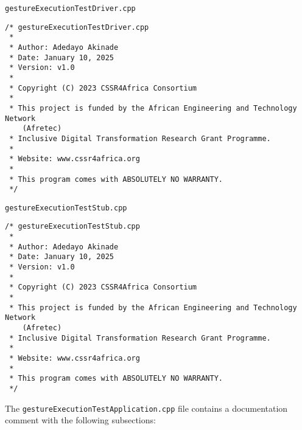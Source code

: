 \documentclass{CSSRforAfrica}
\newcommand{\blank}{~\\}
\newcommand{\checkboxChecked}{\fbox{\ding{51}}} %
\begin{document}
\begin{description}
\newpage
\item[\checkboxChecked] {\small \verb+gestureExecutionTestDriver.cpp+}  
{\small \begin{verbatim}
/* gestureExecutionTestDriver.cpp
 *
 * Author: Adedayo Akinade
 * Date: January 10, 2025
 * Version: v1.0
 * 
 * Copyright (C) 2023 CSSR4Africa Consortium
 * 
 * This project is funded by the African Engineering and Technology Network
    (Afretec) 
 * Inclusive Digital Transformation Research Grant Programme. 
 *
 * Website: www.cssr4africa.org
 *
 * This program comes with ABSOLUTELY NO WARRANTY.
 */
\end{verbatim} }

\item[\checkboxChecked]  {\small \verb+gestureExecutionTestStub.cpp+}  
{\small \begin{verbatim}
/* gestureExecutionTestStub.cpp
 *
 * Author: Adedayo Akinade
 * Date: January 10, 2025
 * Version: v1.0
 * 
 * Copyright (C) 2023 CSSR4Africa Consortium
 * 
 * This project is funded by the African Engineering and Technology Network
    (Afretec) 
 * Inclusive Digital Transformation Research Grant Programme. 
 *
 * Website: www.cssr4africa.org
 *
 * This program comes with ABSOLUTELY NO WARRANTY.
 */
\end{verbatim} }

\end{description} 
%
\noindent The {\small \verb+gestureExecutionTestApplication.cpp+} file contains a documentation comment with the following subsections:
\end{document}
